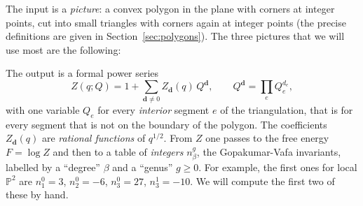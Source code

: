 \documentclass[11pt]{article}
\theoremstyle{plain}
\theoremstyle{definition}
\theoremstyle{remark}
\newcommand{\PP}{\mathbb{P}}
\begin{document}
The input is a \textit{picture}: a convex polygon in the plane with corners at integer points,
cut into small triangles with corners again at integer points (the precise definitions are
given in Section~\ref{sec:polygons}). The three pictures that we will use most are the
following:
\begin{center}
\qquad\qquad
{}\qquad\qquad
{}
\end{center}
The output is a formal power series
\begin{equation}\label{eq:Zintro}
Z(q;Q)=1+\sum_{\mathbf d\neq 0} Z_{\mathbf d}(q)\,Q^{\mathbf d},\qquad
Q^{\mathbf d}=\prod_e Q_e^{d_e},
\end{equation}
with one variable $Q_e$ for every \textit{interior} segment $e$ of the triangulation, that is
for every segment that is not on the boundary of the polygon. The coefficients
$Z_{\mathbf d}(q)$ are \textit{rational functions} of $q^{1/2}$. From $Z$ one passes to the free
energy $F=\log Z$ and then to a table of \textit{integers} $n^g_\beta$, the Gopakumar-Vafa
invariants, labelled by a ``degree'' $\beta$ and a ``genus'' $g\ge 0$. For example, the first
ones for local $\PP^2$ are $n^0_1=3$, $n^0_2=-6$, $n^0_3=27$, $n^1_3=-10$. We will compute the
first two of these by hand.
\end{document}

